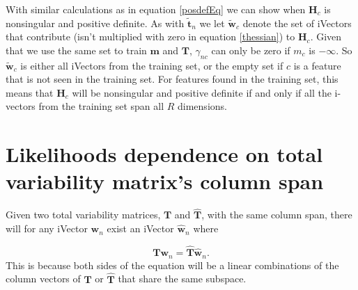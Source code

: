 With similar calculations as in equation \ref{posdefEq} we can show when $\mathbf{H}_c$ is nonsingular and positive definite. As with $\mathbf{\tilde{t}}_n$ we let $\mathbf{\tilde{w}}_c$ denote the set of iVectors that contribute (isn't multiplied with zero in equation \ref{thessian}) to $\mathbf{H}_c$. Given that we use the same set to train $\mathbf{m}$ and $\mathbf{T}$, $\gamma_{nc}$ can only be zero if $m_c$ is $-\infty$. So $\mathbf{\tilde{w}}_c$ is either all iVectors from the training set, or the empty set if $c$ is a feature that is not seen in the training set. For features found in the training set, this means that $\mathbf{H}_c$ will be nonsingular and positive definite if and only if all the i-vectors from the training set span all $R$ dimensions.

\section{Likelihoods dependence on total variability matrix's column span}
\label{sect:orthproof}

Given two total variability matrices, $\mathbf{T}$ and $\mathbf{\hat{T}}$, with the same column span, there will for any iVector $\mathbf{w}_n$ exist an iVector $\mathbf{\hat{w}}_n$ where 

\begin{equation}
\label{colpropEq}
\mathbf{Tw}_n = \mathbf{\hat{T}\hat{w}}_n.
\end{equation}
This is because both sides of the equation will be a linear combinations of the column vectors of $\mathbf{T}$ or $\mathbf{\hat{T}}$ that share the same subspace. 

